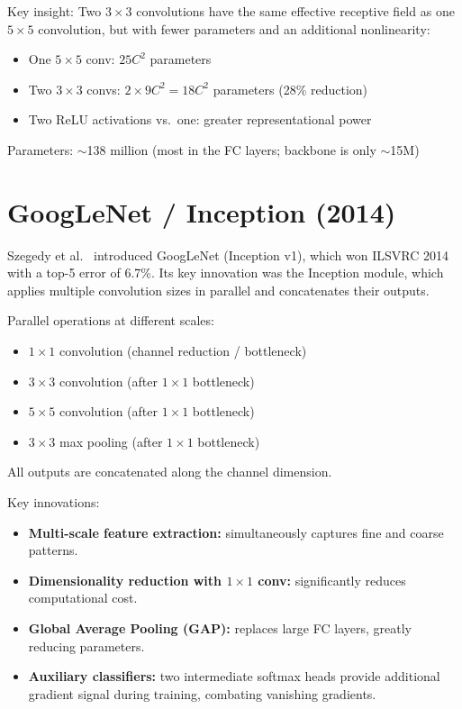 Key insight: Two $3\times3$ convolutions have the same effective receptive field as one $5\times5$ convolution, but with fewer parameters and an additional nonlinearity:
\begin{itemize}
    \item One $5\times5$ conv: $25C^2$ parameters
    \item Two $3\times3$ convs: $2 \times 9C^2 = 18C^2$ parameters (28\% reduction)
    \item Two ReLU activations vs.\ one: greater representational power
\end{itemize}

Parameters: $\sim$138 million (most in the FC layers; backbone is only $\sim$15M)

\section{GoogLeNet / Inception (2014)}

Szegedy et al.\ \cite{szegedy2015going} introduced GoogLeNet (Inception v1), which won ILSVRC 2014 with a top-5 error of 6.7\%. Its key innovation was the Inception module, which applies multiple convolution sizes in parallel and concatenates their outputs.

\begin{architecture}
Parallel operations at different scales:
\begin{itemize}
    \item $1\times1$ convolution (channel reduction / bottleneck)
    \item $3\times3$ convolution (after $1\times1$ bottleneck)
    \item $5\times5$ convolution (after $1\times1$ bottleneck)
    \item $3\times3$ max pooling (after $1\times1$ bottleneck)
\end{itemize}
All outputs are concatenated along the channel dimension.
\end{architecture}

Key innovations:
\begin{itemize}
    \item \textbf{Multi-scale feature extraction:} simultaneously captures fine and coarse patterns.
    \item \textbf{Dimensionality reduction with $1\times1$ conv:} significantly reduces computational cost.
    \item \textbf{Global Average Pooling (GAP):} replaces large FC layers, greatly reducing parameters.
    \item \textbf{Auxiliary classifiers:} two intermediate softmax heads provide additional gradient signal during training, combating vanishing gradients.
\end{itemize}

